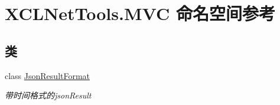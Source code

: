 \hypertarget{namespace_x_c_l_net_tools_1_1_m_v_c}{}\section{X\+C\+L\+Net\+Tools.\+M\+VC 命名空间参考}
\label{namespace_x_c_l_net_tools_1_1_m_v_c}
\subsection*{类}
\begin{DoxyCompactItemize}
\item 
class \hyperlink{class_x_c_l_net_tools_1_1_m_v_c_1_1_json_result_format}{Json\+Result\+Format}
\begin{DoxyCompactList}\small\item\em 带时间格式的json\+Result \end{DoxyCompactList}\end{DoxyCompactItemize}
